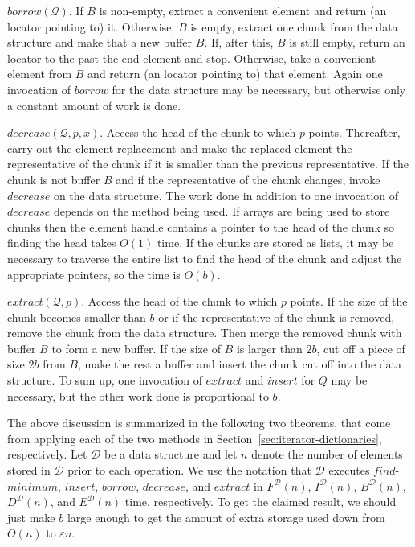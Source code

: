 \documentclass{DIKU-article}
\newcommand{\Findmin}{\mbox{$\mathit{find}$\textnormal{-}}\allowbreak{}\mbox{$\mathit{minimum}$}}
\newcommand{\Insert}{\mbox{$\mathit{insert}$}}
\newcommand{\Extract}{\mbox{$\mathit{extract}$}}
\newcommand{\Decrease}{\mbox{$\mathit{decrease}$}}
\newcommand{\Borrow}{\mbox{$\mathit{borrow}$}}
\newcommand{\secref}[1]{\mbox{Section~\ref{sec:#1}}}
\begin{document}
\Borrow{}$(\mathcal{Q})$. If $B$ is non-empty, extract a convenient
element and return (an locator pointing to) it.  Otherwise, $B$ is
empty, extract one chunk from the data structure and make that a new
buffer $B$. If, after this, $B$ is still empty, return an locator to
the past-the-end element and stop.  Otherwise, take a convenient
element from $B$ and return (an locator pointing to) that element.
Again one invocation of \Borrow{} for the data structure may be
necessary, but otherwise only a constant amount of work is done.

\Decrease{}$(\mathcal{Q}, p, x)$. Access the head of the chunk to
which $p$ points. Thereafter, carry out the element replacement and
make the replaced element the representative of the chunk if it is
smaller than the previous representative. If the chunk is not buffer
$B$ and if the representative of the chunk changes, invoke \Decrease{}
on the data structure. The work done in addition to one invocation of
\Decrease{} depends on the method being used.  If arrays are being
used to store chunks then the element handle contains a pointer to the
head of the chunk so finding the head takes $O(1)$ time.  If the
chunks are stored as lists, it may be necessary to traverse the entire
list to find the head of the chunk and adjust the appropriate
pointers, so the time is $O(b)$.

\Extract{}$(\mathcal{Q}, p)$. Access the head of the chunk to which
$p$ points. If the size of the chunk becomes smaller than $b$ or if
the representative of the chunk is removed, remove the chunk from the
data structure. Then merge the removed chunk with buffer $B$ to form a
new buffer. If the size of $B$ is larger than $2b$, cut off a piece of
size $2b$ from $B$, make the rest a buffer and insert the chunk cut
off into the data structure. To sum up, one invocation of \Extract{}
and \Insert{} for $Q$ may be necessary, but the other work done is
proportional to $b$.

The above discussion is summarized in the following two theorems, that
come from applying each of the two methods in
\secref{iterator-dictionaries}, respectively.  Let
$\mathcal{D}$ be a data structure and let $n$ denote the number of
elements stored in $\mathcal{D}$ prior to each operation.  We use the
notation that $\mathcal{D}$ executes \Findmin{}, \Insert{},
\Borrow{}, \Decrease{}, and \Extract{} in 
$F^{\mathcal{D}}(n)$,
$I^{\mathcal{D}}(n)$, 
$B^{\mathcal{D}}(n)$, 
$D^{\mathcal{D}}(n)$, and
$E^{\mathcal{D}}(n)$ time, respectively. To get the claimed result, we
should just make $b$ large enough to get the amount of extra storage
used down from $O(n)$ to $\varepsilon n$.
\end{document}
